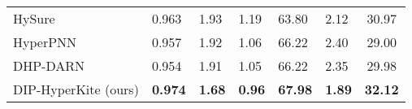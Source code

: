 \documentclass[journal]{IEEEtran}
\begin{document}
\begin{table}[tb]
\begin{tabular}{lp{0.5cm}p{0.5cm}p{0.6cm}p{0.5cm}p{0.6cm}c}
        HySure \cite{hysure}            & 0.963            & 1.93            & 1.19            & 63.80           & 2.12            & 30.97\\
        HyperPNN \cite{Hyper-PNN}       & 0.957            & 1.92            & 1.06            & 66.22           & 2.40            & 29.00\\
        DHP-DARN \cite{DHP-DARN}        & 0.954            & 1.91            & 1.05            & 66.22           & 2.35            & 29.98\\
        DIP-HyperKite (ours)            & \textbf{0.974}   & \textbf{1.68}   & \textbf{0.96}   & \textbf{67.98}  & \textbf{1.89}   & \textbf{32.12}\\
        \hline
        \end{tabular}
        \label{tab:botswana_final_fuse_quant}
    \end{table}
    
\end{document}
